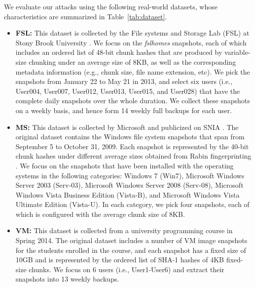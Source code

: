 We evaluate our attacks using the following real-world datasets, whose
characteristics are summarized in Table~\ref{tab:dataset}. 

\begin{itemize}[leftmargin=*]
\item 
\textbf{FSL:} This dataset is collected by the File systems and
        Storage Lab (FSL) at Stony Brook University \cite{sun16,FSL14,sun18}. We focus on
the {\em fslhomes} snapshots, each of which includes an ordered list of 48-bit
chunk hashes that are produced by variable-size chunking under an average size
of 8KB, as well as the corresponding metadata information (e.g., chunk size,
file name extension, etc). We pick the snapshots from January 22 to May 21 in
2013, and select six users (i.e., User004, User007, User012, User013, User015,
and User028) that have the complete daily snapshots over the whole duration.
We collect these snapshots on a weekly basis, and hence form 14 weekly full
backups for each user.  
\item 
\textbf{MS:} This dataset is collected by Microsoft
\cite{meyer11} and publicized on SNIA \cite{ms}. The original dataset contains
the Windows file system snapshots that span from September 5 to October 31,
2009. Each snapshot is represented by the 40-bit chunk hashes under different
average sizes obtained from Rabin fingerprinting \cite{rabin81}.  We focus on
the snapshots that have been installed with the operating systems in the
following categories: Windows 7 (Win7), Microsoft Windows Server 2003
(Serv-03), Microsoft Windows Server 2008 (Serv-08), Microsoft Windows Vista
Business Edition (Vista-B), and Microsoft Windows Vista Ultimate Edition
(Vista-U). In each category, we pick four snapshots, each of which is
configured with the average chunk size of 8KB.   
\item 
\textbf{VM:} This dataset is collected from a university programming course in
Spring 2014. The original dataset includes a number of VM image snapshots for
the students enrolled in the course, and each snapshot has a fixed size of
10GB and is represented by the ordered list of SHA-1 hashes of 4KB fixed-size
chunks. We focus on 6 users (i.e., User1-User6) and extract their snapshots
into 13 weekly backups.  
\end{itemize}


